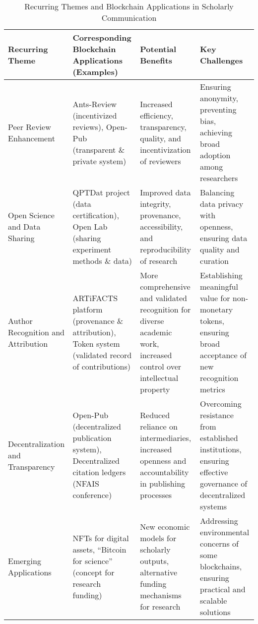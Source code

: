 \documentclass{article}
\begin{document}
\begin{table}[ht]
    \centering
    \caption{Recurring Themes and Blockchain Applications in Scholarly Communication}
    \label{tab:recurring-themes-blockchain}
    \begin{tabularx}{\textwidth}{|X|X|X|X|}
        \hline
        \textbf{Recurring Theme}           & \textbf{Corresponding Blockchain Applications (Examples)}                                        & \textbf{Potential Benefits}                                                                                          & \textbf{Key Challenges}                                                                                     \\
        \hline
        Peer Review Enhancement            & Ants-Review (incentivized reviews), Open-Pub (transparent \& private system)                     & Increased efficiency, transparency, quality, and incentivization of reviewers                                        & Ensuring anonymity, preventing bias, achieving broad adoption among researchers                             \\
        \hline
        Open Science and Data Sharing      & QPTDat project (data certification), Open Lab (sharing experiment methods \& data)               & Improved data integrity, provenance, accessibility, and reproducibility of research                                  & Balancing data privacy with openness, ensuring data quality and curation                                    \\
        \hline
        Author Recognition and Attribution & ARTiFACTS platform (provenance \& attribution), Token system (validated record of contributions) & More comprehensive and validated recognition for diverse academic work, increased control over intellectual property & Establishing meaningful value for non-monetary tokens, ensuring broad acceptance of new recognition metrics \\
        \hline
        Decentralization and Transparency  & Open-Pub (decentralized publication system), Decentralized citation ledgers (NFAIS conference)   & Reduced reliance on intermediaries, increased openness and accountability in publishing processes                    & Overcoming resistance from established institutions, ensuring effective governance of decentralized systems \\
        \hline
        Emerging Applications              & NFTs for digital assets, ``Bitcoin for science'' (concept for research funding)                  & New economic models for scholarly outputs, alternative funding mechanisms for research                               & Addressing environmental concerns of some blockchains, ensuring practical and scalable solutions            \\
        \hline
    \end{tabularx}
\end{table}




\end{document}
